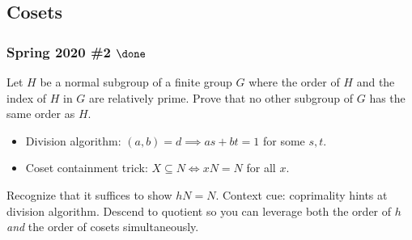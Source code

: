 \hypertarget{cosets}{%
\subsection{Cosets}\label{cosets}}

\hypertarget{spring-2020-2-done}{%
\subsubsection{\texorpdfstring{Spring 2020 \#2
\(\done\)}{Spring 2020 \#2 \textbackslash done}}\label{spring-2020-2-done}}

Let \(H\) be a normal subgroup of a finite group \(G\) where the order
of \(H\) and the index of \(H\) in \(G\) are relatively prime. Prove
that no other subgroup of \(G\) has the same order as \(H\).

\begin{concept}

\envlist

\begin{itemize}
\tightlist
\item
  Division algorithm: \((a,b)= d\implies as+bt =1\) for some \(s, t\).
\item
  Coset containment trick: \(X\subseteq N \iff xN = N\) for all \(x\).
\end{itemize}

\end{concept}

\begin{strategy}

Recognize that it suffices to show \(hN = N\). Context cue: coprimality
hints at division algorithm. Descend to quotient so you can leverage
both the order of \(h\) \emph{and} the order of cosets simultaneously.

\end{strategy}

